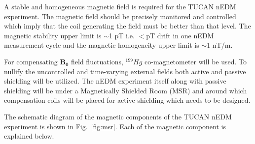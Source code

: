 A stable and homogeneous magnetic field is required for the TUCAN nEDM experiment. The magnetic field should be precisely monitored and controlled which imply that the coil generating the field must be better than that level. The magnetic stability upper limit is $\sim$1 pT i.e. $<$pT drift in one nEDM measurement cycle and the magnetic homogeneity upper limit is $\sim$1 nT/m. 


For compensating $\bm{B_0}$ field fluctuations,  $^{199}Hg$ co-magnetometer will be used. To nullify the uncontrolled and time-varying external fields both active and passive shielding will be utilized. The nEDM experiment itself along with passive shielding will be under a Magnetically Shielded Room (MSR) and around which compensation coils will be placed for active shielding which needs to be designed. 





The schematic diagram of the magnetic components of the
TUCAN nEDM experiment is shown in Fig.~\ref{fig:msr}. Each of the magnetic component is explained below. 







